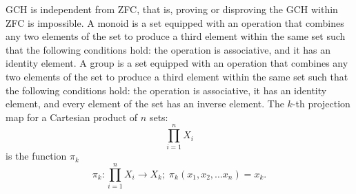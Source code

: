 \documentclass[a4paper,12pt]{article}
\begin{document}
GCH is independent from ZFC, that is, proving or disproving the GCH within ZFC is impossible.
A monoid is a set equipped with an operation that combines any two elements of the set to produce a third element within the same set such that the following conditions hold: the operation is associative, and it has an identity element.
A group is a set equipped with an operation that combines any two elements of the set to produce a third element within the same set such that the following conditions hold: the operation is associative, it has an identity element, and every element of the set has an inverse element.
The $k$-th projection map for a Cartesian product of $n$ sets:
\[\prod_{i=1}^nX_i\]
is the function $\pi_k$
\[\pi_k\colon\prod_{i=1}^nX_i\to X_k;\;\pi_k(x_1,x_2,\ldots x_n)=x_k.\]
\end{document}
